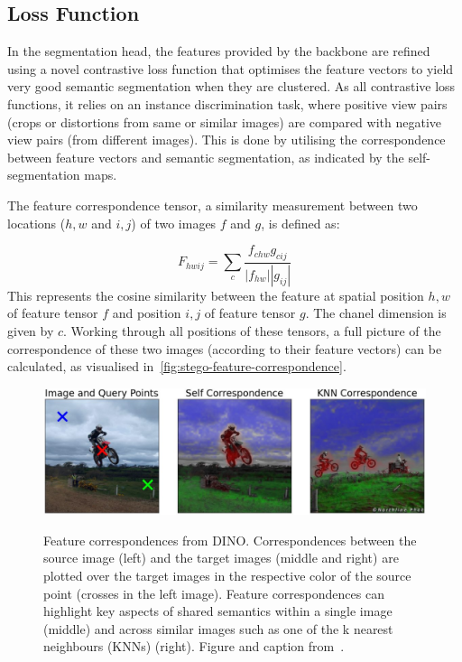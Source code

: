 \subsection{Loss Function}\label{subsec:stego-loss-function}
In the segmentation head, the features provided by the backbone are refined using a novel contrastive loss function that optimises the feature vectors to yield very good semantic segmentation when they are clustered.
As all contrastive loss functions, it relies on an instance discrimination task, where positive view pairs (crops or distortions from same or similar images) are compared with negative view pairs (from different images).
This is done by utilising the correspondence between feature vectors and semantic segmentation, as indicated by the self-segmentation maps.~\autocite{Hamilton2022}

\parbox{\textwidth}{The feature correspondence tensor, a similarity measurement between two locations ($h,w$ and $i,j$) of two images $f$ and $g$, is defined as:}

\begin{equation}
    F_{hwij} = \sum_c \frac{f_{chw} g_{cij}}{|f_{hw}| |g_{ij}|}  
    \label{eq:correspondence}
\end{equation}
This represents the cosine similarity between the feature at spatial position $h,w$ of feature tensor $f$ and position $i,j$ of feature tensor $g$.
The chanel dimension is given by $c$.
Working through all positions of these tensors, a full picture of the correspondence of these two images (according to their feature vectors) can be calculated, as visualised in~\autoref{fig:stego-feature-correspondence}.~\autocite{Hamilton2022}

\begin{figure}[!htb]
    \centering
    \includegraphics[width=\textwidth]{pictures/stego-feature-correspondence}\\
    \caption[Feature Correspondence of Two Images]{Feature correspondences from DINO. Correspondences between the source image (left) and the target images (middle and right) are plotted over the target images in the respective color of the source point (crosses in the left image). Feature correspondences can highlight key aspects of shared semantics within a single image (middle) and across similar images such as one of the k nearest neighbours (KNNs) (right). Figure and caption from~\autocite{Hamilton2022}.}
    \label{fig:stego-feature-correspondence}
\end{figure}

